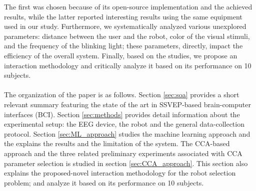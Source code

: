 \documentclass{svmult}
\begin{document}
The first was chosen because of its open-source implementation and the achieved results, while the latter reported interesting results using the same equipment used in our study. Furthermore, we systematically analyzed various unexplored parameters: distance between the user and the robot, color of the visual stimuli, and the frequency of the blinking light; these parameters, directly, impact the efficiency of the overall system. Finally, based on the studies, we propose an interaction methodology and critically analyze it based on its performance on 10 subjects.\\
\\
The organization of the paper is as follows. Section \ref{sec:soa} provides a short relevant summary featuring the state of the art in SSVEP-based brain-computer interfaces (BCI). Section \ref{sec:methods} provides detail information about the experimental setup: the EEG device, the robot and the general data-collection protocol. Section \ref{sec:ML_approach} studies the machine learning approach and the explains the results and the limitation of the system. The CCA-based approach and the three related preliminary experiments associated with CCA parameter selection is studied in section \ref{sec:CCA_approach}. This section also explains the proposed-novel interaction methodology for the robot selection problem; and analyze it based on its performance on 10 subjects. 
\end{document}
